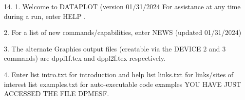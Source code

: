 14.
1. Welcome to DATAPLOT (version 01/31/2024  For assistance at
   any time during a run, enter HELP   .

2. For a list of new commands/capabilities,
   enter NEWS  (updated 01/31/2024)

3. The alternate Graphics output files (creatable
   via the DEVICE 2 and 3 commands) are
   dppl1f.tex and dppl2f.tex respectively.

4. Enter  list intro.txt     for introduction and help
          list links.txt     for links/sites of interest
          list examples.txt  for auto-executable code examples
YOU HAVE JUST ACCESSED THE FILE DPMESF.
